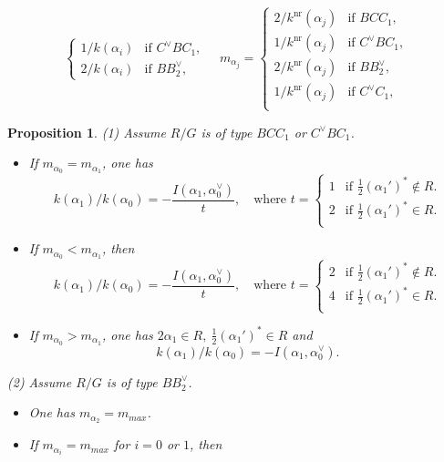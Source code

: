 \documentclass[11pt]{amsart}
\newcommand{\nr}{\mathrm{nr}}
\newcommand{\w}{\mathrm{w}}
\newtheorem{prop}[thm]{Proposition}%
\begin{document}
{\begin{equation}
\begin{cases}
1/k(\alpha_i) & \text{if $C^\vee BC_1$},\\
2/k(\alpha_i) & \text{if $BB^\vee_2$},
\end{cases}
\quad
m_{\alpha_j}=\begin{cases}
2/k^\nr(\alpha_j) & \text{if $BCC_1$},\\
1/k^\nr(\alpha_j)
& \text{if $C^\vee BC_1$},\\
2/k^\nr(\alpha_j) & \text{if $BB^\vee_2$},\\
1/k^\nr(\alpha_j) & \text{if $C^\vee C_1$},\\
\end{cases}
\end{equation}

{
\begin{prop}\label{prop:shape-diagram2}
{\rm (1)} Assume $R/G$ is of type $BCC_1$ or $C^\vee BC_1$.
\begin{itemize}
\item[(a)] If $m_{\alpha_0}=m_{\alpha_1}$, one has 
\[k(\alpha_1)/k(\alpha_0)=-\frac{I(\alpha_1,\alpha_0^\vee)}{t},\quad
\text{where } t=\begin{cases}
1 &\text{if }\tfrac12 (\alpha_1')^\ast \not\in R.\\
2 & \text{if }\tfrac12 (\alpha_1')^\ast \in R.\\
\end{cases}\]
\item[(b)] If $m_{\alpha_0}<m_{\alpha_1}$, then  
\[k(\alpha_1)/k(\alpha_0)=-\frac{I(\alpha_1,\alpha_0^\vee)}{t},\quad
\text{where } t=\begin{cases}
2 &\text{if }\tfrac12 (\alpha_1')^\ast \not\in R.\\
4 & \text{if }\tfrac12 (\alpha_1')^\ast \in R.\\
\end{cases}\]
\item[(c)] If $m_{\alpha_0}>m_{\alpha_1}$, one has 
$2\alpha_1\in R,\ \frac12 (\alpha_1')^\ast\in R$ and
\[k(\alpha_1)/k(\alpha_0)=-I(\alpha_1,\alpha_0^\vee).\]
\end{itemize}
\vskip 1mm
\noindent
{\rm (2)} Assume $R/G$ is of type $BB_2^\vee$. 
\begin{itemize}
\item[(a)] One has $m_{\alpha_2}=m_{max}$.
\vskip 1mm
\item[{\rm (b)}] If $m_{\alpha_i}=m_{max}$ for $i=0$ or $1$, then 

\end{itemize}
\end{prop}}}
\end{document}
